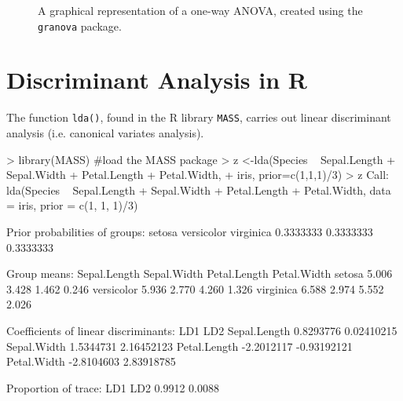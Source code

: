 \begin{figure}[ht!]
  \caption{A graphical representation of a one-way ANOVA, created using the \texttt{granova} package.\label{fig:granova}}
\end{figure}


\section{Discriminant Analysis in R}

The function \texttt{lda()}, found in the R library \texttt{MASS}, carries out linear discriminant analysis (i.e. canonical variates analysis). 


\begin{R}
> library(MASS) #load the MASS package
> z <-lda(Species ~ Sepal.Length + Sepal.Width + Petal.Length + Petal.Width,
+           iris, prior=c(1,1,1)/3)
> z
Call:
lda(Species ~ Sepal.Length + Sepal.Width + Petal.Length + Petal.Width, 
    data = iris, prior = c(1, 1, 1)/3)

Prior probabilities of groups:
    setosa versicolor  virginica 
 0.3333333  0.3333333  0.3333333 

Group means:
           Sepal.Length Sepal.Width Petal.Length Petal.Width
setosa            5.006       3.428        1.462       0.246
versicolor        5.936       2.770        4.260       1.326
virginica         6.588       2.974        5.552       2.026

Coefficients of linear discriminants:
                    LD1         LD2
Sepal.Length  0.8293776  0.02410215
Sepal.Width   1.5344731  2.16452123
Petal.Length -2.2012117 -0.93192121
Petal.Width  -2.8104603  2.83918785

Proportion of trace:
   LD1    LD2 
0.9912 0.0088 
\end{R}

